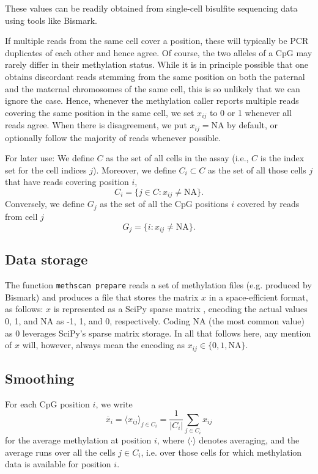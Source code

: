 \documentclass[twocolumn,10pt]{article}
\begin{document}
These values can be readily obtained from single-cell bisulfite sequencing data using tools like Bismark.

If multiple reads from the same cell cover a position, these will typically be PCR duplicates of each other and hence agree.
Of course, the two alleles of a CpG may rarely differ in their methylation status.
While it is in principle possible that one obtains discordant reads stemming from the same position on both the paternal and the maternal chromosomes of the same cell, this is so unlikely that we can ignore the case.
Hence, whenever the methylation caller reports multiple reads covering the same position in the same cell, we set $x_{ij}$ to 0 or 1 whenever all reads agree.
When there is disagreement, we put $x_{ij}=\text{NA}$ by default, or optionally follow the majority of reads whenever possible.

For later use: We define $C$ as the set of all cells in the assay (i.e., $C$ is the index set for the cell indices $j$).
Moreover, we define $C_i\subset C$ as the set of all those cells $j$ that have reads covering position $i$,
\[ C_i=\{j\in C: x_{ij}\neq\text{NA}\}.\]
Conversely, we define $G_j$ as the set of all the CpG positions $i$ covered by reads from cell $j$ 
\[ G_j=\{i: x_{ij}\neq\text{NA}\}.\]

\subsection{Data storage}

The function \texttt{methscan prepare} reads a set of methylation files (e.g. produced by Bismark) and produces a file that stores the matrix $x$ in a space-efficient format, as follows:
$x$ is represented as a SciPy sparse matrix \citep{SciPy}, encoding the actual values 0, 1, and NA as -1, 1, and 0, respectively.
Coding NA (the most common value) as 0 leverages SciPy's sparse matrix storage.
In all that follows here, any mention of $x$ will, however, always mean the encoding as $x_{ij}\in\{0,1,\text{NA}\}$.

\subsection{Smoothing}

For each CpG position $i$, we write 
\[\overline{x}_i=\langle x_{ij} \rangle_{j\in C_i} = \frac{1}{|C_i|}\sum_{j\in C_i} x_{ij}\] 
for the average methylation at position $i$, where $\langle\cdot\rangle$ denotes averaging, and the average runs over all the cells $j\in C_i$, i.e.
over those cells for which methylation data is available for position $i$.
\end{document}
